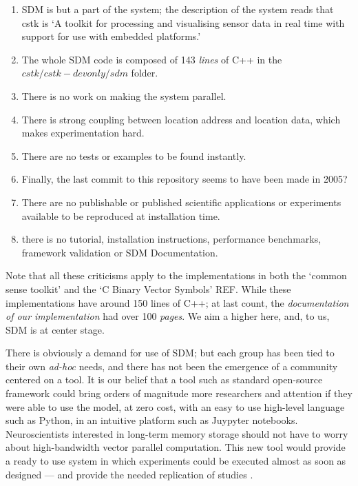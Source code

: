 \begin{enumerate}
    \item SDM is but a part of the system; the description of the system reads that cstk is `A toolkit for processing and visualising sensor data in real time with support for use with embedded platforms.'

    \item The whole SDM code is composed of 143 \emph{lines} of C++ in the $cstk/cstk-devonly/sdm$ folder.

    \item There is no work on making the system parallel.

    \item There is strong coupling between location address and location data, which makes experimentation hard.

    \item There are no tests or examples to be found instantly.

    \item Finally, the last commit to this repository seems to have been made in 2005?

    \item There are no publishable or published scientific applications or experiments available to be reproduced at installation time.

    \item there is no tutorial, installation instructions, performance benchmarks, framework validation or SDM Documentation.

\end{enumerate}

Note that all these criticisms apply to the implementations in both the `common sense toolkit' and the `C Binary Vector Symbols' REF.  While these implementations have around 150 lines of C++; at last count, the \emph{documentation of our implementation} had over 100 \emph{pages}. We aim a higher here, and, to us, SDM is at center stage.

There is obviously a demand for use of SDM; but each group has been tied to their own \emph{ad-hoc} needs, and there has not been the emergence of a community centered on a tool. It is our belief that a tool such as standard open-source framework could bring orders of magnitude more researchers and attention if they were able to use the model, at zero cost, with an easy to use high-level language such as Python, in an intuitive platform such as Juypyter notebooks. Neuroscientists interested in long-term memory storage should not have to worry about high-bandwidth vector parallel computation.  This new tool would provide a ready to use system in which experiments could be executed almost as soon as designed --- and provide the needed replication of studies \citep{shen2014interactive}.


